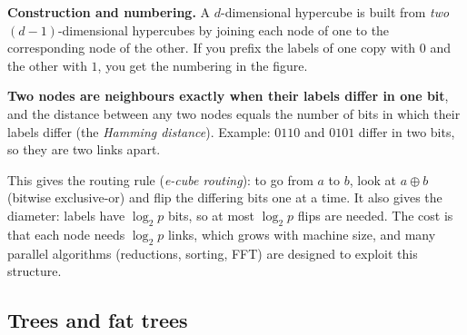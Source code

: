 \begin{center}
\end{center}

\textbf{Construction and numbering.} A $d$-dimensional hypercube is built from \emph{two} $(d-1)$-dimensional hypercubes by joining each node of one to the
corresponding node of the other. If you prefix the labels of one copy with $0$ and the other with $1$, you get the numbering in the figure.

\begin{keyidea}
\textbf{Two nodes are neighbours exactly when their labels differ in one bit}, and the distance between any two nodes equals the number of
bits in which their labels differ (the \emph{Hamming distance}). Example: $0110$ and $0101$ differ in two bits, so they are two links apart.
\end{keyidea}

This gives the routing rule (\emph{e-cube routing}): to go from $a$ to $b$, look at $a\oplus b$ (bitwise exclusive-or) and flip the differing bits one at a time.
It also gives the diameter: labels have $\log_2 p$ bits, so at most $\log_2 p$ flips are needed. The cost is that each node needs $\log_2 p$ links,
which grows with machine size, and many parallel algorithms (reductions, sorting, FFT) are designed to exploit this structure.

\subsection{Trees and fat trees}

